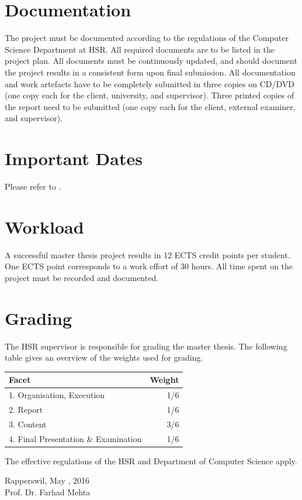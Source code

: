 \documentclass[a4paper]{article}
\begin{document}
\section{Documentation}
The project must be documented according to the regulations of the Computer
Science Department at
HSR\cite{hsr:general}. All
required documents are to be listed in the project plan. All documents must be
continuously updated, and should document the project results in a consistent
form upon final submission. All documentation and work artefacts have to be
completely submitted in three copies on CD/DVD (one copy each for the client,
university, and supervisor). Three printed copies of the report need to be
submitted (one copy each for the client, external examiner, and supervisor).

\section{Important Dates}
Please refer to \cite{hsr:dates}.

\section{Workload}
A successful master thesis project results in 12 ECTS credit points per
student. One ECTS point corresponds to a work effort of 30 hours.
All time spent on the project must be recorded and documented.

\section{Grading}
The HSR supervisor is responsible for grading the master thesis. The following
table gives an overview of the weights used for grading.\\


\begin{center}
\noindent
\begin{tabulary}{1.0\textwidth}{| L | R |}
	\hline
	Facet & Weight \\ . Organisation, Execution	& 1/6 \\
	2. Report	& 1/6 \\
	3. Content	& 3/6 \\
	4. Final Presentation \& Examination & 1/6 \\
	\hline
\end{tabulary}
\end{center}
\noindent
The effective regulations of the HSR and Department of Computer
Science\cite{hsr:rules}
apply.
\vspace{2cm}


\noindent
Rapperswil, May \underline{\hspace{1cm}}, 2016\\
Prof. Dr. Farhad Mehta

\printbibliography
\end{document}
